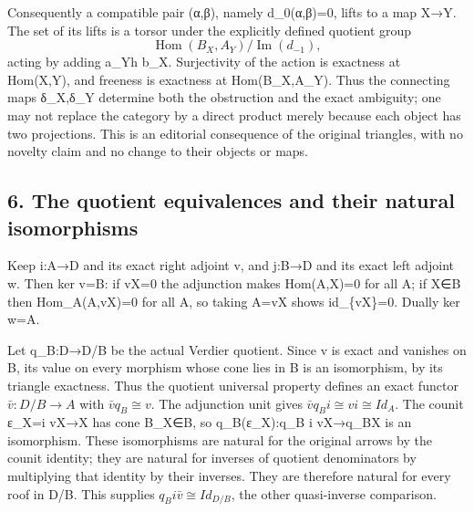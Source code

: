 Consequently a compatible pair (α,\allowbreak{}β)\allowbreak{},\allowbreak{} namely d\_\allowbreak{}0(α,\allowbreak{}β)\allowbreak{}\allowbreak{}=0,\allowbreak{} lifts to a map X\allowbreak{}→Y. The set of its lifts is a torsor under the explicitly defined quotient group \[
 \operatorname{Hom}(B_X,A_Y)/\operatorname{Im}(d_{-1}),
\] acting by adding a\_\allowbreak{}Yh b\_\allowbreak{}X. Surjectivity of the action is exactness at Hom(X,\allowbreak{}Y)\allowbreak{},\allowbreak{} and freeness is exactness at Hom(B\_\allowbreak{}X,\allowbreak{}A\_\allowbreak{}Y)\allowbreak{}. Thus the connecting maps δ\_\allowbreak{}X,\allowbreak{}δ\_\allowbreak{}Y determine both the obstruction and the exact ambiguity; one may not replace the category by a direct product merely because each object has two projections. This is an editorial consequence of the original triangles,\allowbreak{} with no novelty claim and no change to their objects or maps.

\subsection{6. The quotient equivalences and their natural isomorphisms}\label{proofs-11665-12003-the-quotient-equivalences-and-their-natural-isomorphisms}

Keep i:\allowbreak{}A\allowbreak{}→D and its exact right adjoint v,\allowbreak{} and j:\allowbreak{}B\allowbreak{}→D and its exact left adjoint w. Then ker v\allowbreak{}=B:\allowbreak{} if vX\allowbreak{}=0 the adjunction makes Hom(A,\allowbreak{}X)\allowbreak{}\allowbreak{}=0 for all A; if X\allowbreak{}∈B then Hom\_\allowbreak{}A(A,\allowbreak{}vX)\allowbreak{}\allowbreak{}=0 for all A,\allowbreak{} so taking A\allowbreak{}=vX shows id\_\allowbreak{}\{vX\}\allowbreak{}=0. Dually ker w\allowbreak{}=A.

Let q\_\allowbreak{}B:\allowbreak{}D\allowbreak{}→D/\allowbreak{}B be the actual Verdier quotient. Since v is exact and vanishes on B,\allowbreak{} its value on every morphism whose cone lies in B is an isomorphism,\allowbreak{} by its triangle exactness. Thus the quotient universal property defines an exact functor \(\bar v:D/B\to A\) with \(\bar v q_B\cong v\). The adjunction unit gives \(\bar v q_B i\cong v i\cong Id_A\). The counit ε\_\allowbreak{}X\allowbreak{}=i vX\allowbreak{}→X has cone B\_\allowbreak{}X\allowbreak{}∈B,\allowbreak{} so q\_\allowbreak{}B(ε\_\allowbreak{}X)\allowbreak{}:\allowbreak{}q\_\allowbreak{}B i vX\allowbreak{}→q\_\allowbreak{}BX is an isomorphism. These isomorphisms are natural for the original arrows by the counit identity; they are natural for inverses of quotient denominators by multiplying that identity by their inverses. They are therefore natural for every roof in D/\allowbreak{}B. This supplies \(q_B i\bar v\cong Id_{D/B}\),\allowbreak{} the other quasi-inverse comparison.

